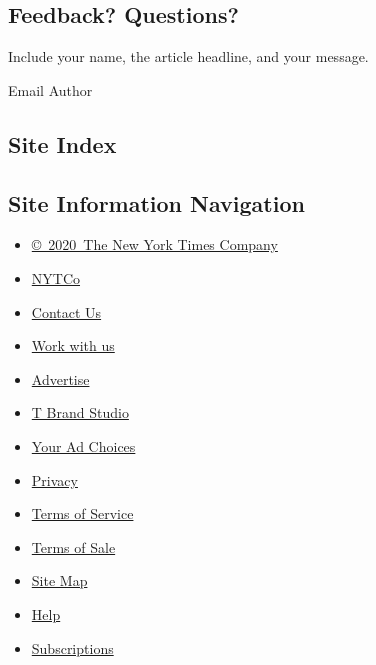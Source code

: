 \hypertarget{feedback-questions}{%
\subsection{Feedback? Questions?}\label{feedback-questions}}

Include your name, the article headline, and your message.

Email Author

\hypertarget{site-index}{%
\subsection{Site Index}\label{site-index}}

\hypertarget{site-information-navigation}{%
\subsection{Site Information
Navigation}\label{site-information-navigation}}

\begin{itemize}
\tightlist
\item
  \href{https://help.nytimes.com/hc/en-us/articles/115014792127-Copyright-notice}{©~2020~The
  New York Times Company}
\end{itemize}

\begin{itemize}
\tightlist
\item
  \href{https://www.nytco.com/}{NYTCo}
\item
  \href{https://help.nytimes.com/hc/en-us/articles/115015385887-Contact-Us}{Contact
  Us}
\item
  \href{https://www.nytco.com/careers/}{Work with us}
\item
  \href{https://nytmediakit.com/}{Advertise}
\item
  \href{http://www.tbrandstudio.com/}{T Brand Studio}
\item
  \href{https://www.nytimes.com/privacy/cookie-policy\#how-do-i-manage-trackers}{Your
  Ad Choices}
\item
  \href{https://www.nytimes.com/privacy}{Privacy}
\item
  \href{https://help.nytimes.com/hc/en-us/articles/115014893428-Terms-of-service}{Terms
  of Service}
\item
  \href{https://help.nytimes.com/hc/en-us/articles/115014893968-Terms-of-sale}{Terms
  of Sale}
\item
  \href{https://spiderbites.nytimes.com}{Site Map}
\item
  \href{https://help.nytimes.com/hc/en-us}{Help}
\item
  \href{https://www.nytimes.com/subscription?campaignId=37WXW}{Subscriptions}
\end{itemize}
